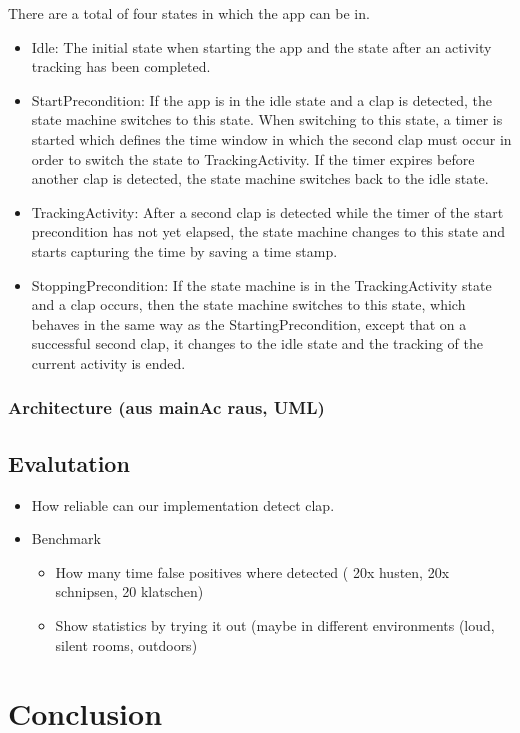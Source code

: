 \documentclass
[
 12pt, %
       DIV12,
       a4paper,
       oneside,
       titlepage,
       parskip=half,
       headings=normal,
       listof=totoc,
       bibliography=totoc,
       index=totoc,
       captions=tableheading,
       ]{scrreprt}
\begin{document}
There are a total of four states in which the app can be in. 
\begin{itemize}
\item Idle: The initial state when starting the app and the state after an activity tracking has been completed.
\item StartPrecondition: If the app is in the idle state and a clap is detected, the state machine switches to this state. When switching to this state, a timer is started which defines the time window in which the second clap must occur in order to switch the state to TrackingActivity. If the timer expires before another clap is detected, the state machine switches back to the idle state.
\item TrackingActivity: After a second clap is detected while the timer of the start precondition has not yet elapsed, the state machine changes to this state and starts capturing the time by saving a time stamp.
\item StoppingPrecondition: If the state machine is in the TrackingActivity state and a clap occurs, then the state machine switches to this state, which behaves in the same way as the StartingPrecondition, except that on a successful second clap, it changes to the idle state and the tracking of the current activity is ended.
\end{itemize}

\subsection{Architecture (aus mainAc raus, UML)}
\label{sec:orgb0029c3}
\section{Evalutation}
\label{sec:org4839a4f}
\begin{itemize}
\item How reliable can our implementation detect clap.
\item Benchmark
\begin{itemize}
\item How many time false positives where detected ( 20x husten, 20x schnipsen, 20 klatschen)
\item Show statistics by trying it out (maybe in different environments (loud,
silent rooms, outdoors)
\end{itemize}
\end{itemize}



\chapter{Conclusion}
\label{sec:org83012f6}
\end{document}

